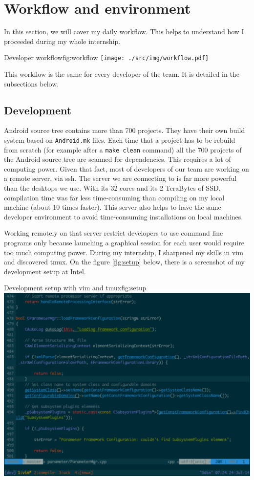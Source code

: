 \section{Workflow and environment}
In this section, we will cover my daily workflow. This helps
to understand how I proceeded during my whole internship.

\begin{figureGraphics}{Developer workflow}{fig:workflow}
    \texttt{[image: ./src/img/workflow.pdf]}
\end{figureGraphics}

This workflow is the same for every developer of the team. It is
detailed in the subsections below.

\subsection{Development}
Android source tree contains more than 700 projects. They have their own build system
based on \lstinline{Android.mk} files. Each time that a project has to be rebuild from scratch (for example after a  \lstinline{make clean} command) all
the 700 projects of the Android source tree are scanned for dependencies. This requires a lot of computing power.
Given that fact, most of developers of our team are working on a remote server, via ssh.
The server we are connecting to is far more powerful than the desktops we use.
With its 32 cores and its 2 TeraBytes of SSD, compilation time was far less time-consuming
than compiling on my local machine (about 10 times faster).
This server also helps to have the same developer environment to avoid
time-consuming installations on local machines.

Working remotely on that server restrict developers to use command line programs only because
launching a graphical session for each user would require too much computing power.
During my internship, I sharpened my skills in \gls{vim} and discovered \gls{tmux}.
On the figure \ref{fig:setup} below, there is a screenshot of my development setup at Intel.

\begin{figureGraphics}{Development setup with vim and tmux}{fig:setup}
\includegraphics[width=\textwidth]{./src/img/setup.pdf}
\end{figureGraphics}

